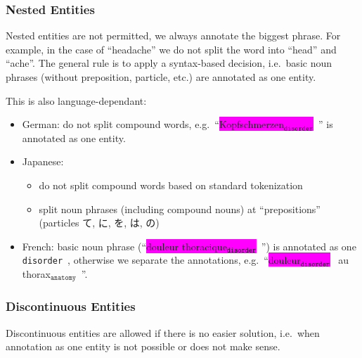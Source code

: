 \documentclass[12pt]{article}
\theoremstyle{definition}
\newcommand{\anatomy}[1]{\colorbox{dollarbill}{#1$_{\texttt{anatomy}}$}\ }
\newcommand{\disorder}[1]{\colorbox{fuchsia}{#1$_{\texttt{disorder}}$}\ }
\newcommand{\dis}{\texttt{disorder}\ }
\begin{document}
\subsubsection*{Nested Entities}

Nested entities are not permitted, we always annotate the biggest phrase.
For example, in the case of ``headache'' we do not split the word into ``head'' and ``ache''. 
The general rule is to apply a syntax-based decision, i.e.~basic noun phrases (without preposition, particle, etc.) are annotated as one entity.

This is also language-dependant:
\begin{itemize}
    \item German: do not split compound words, e.g.~``\disorder{Kopfschmerzen}'' is annotated as one entity.
    \item Japanese: 
    \begin{itemize}
        \item do not split compound words based on standard tokenization
        \item split noun phrases (including compound nouns) at ``prepositions'' (particles て, に, を, は, の)
    \end{itemize}
    
    \item French: basic noun phrase (``\disorder{douleur thoracique}'') is annotated as one \dis, otherwise  we separate the annotations, e.g.~``\disorder{douleur} au \anatomy{thorax}''.
\end{itemize}


\subsubsection*{Discontinuous Entities}

Discontinuous entities are allowed if there is no easier solution, i.e.~when annotation as one entity is not possible or does not make sense.
\end{document}
